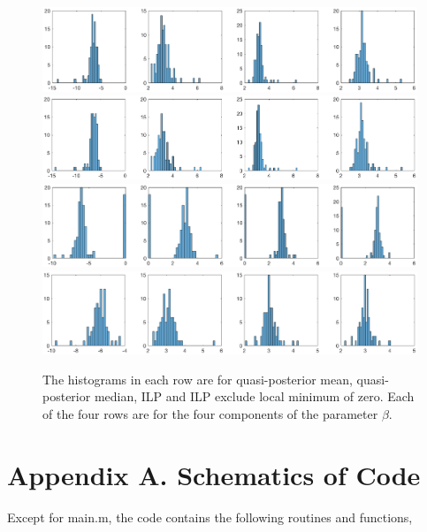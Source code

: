 \documentclass[12pt]{article}
\theoremstyle{plain} \newtheorem{theorem}{Theorem}
\theoremstyle{definition} \newtheorem{definition}{Definition}
\begin{document}
\begin{figure}[h]
    \centering
    \includegraphics[width=1.2\textwidth]{figures/lte-mean.eps}
    \includegraphics[width=1.2\textwidth]{figures/lte-median.eps}
    \includegraphics[width=1.2\textwidth]{figures/ilp-allrep.eps}
    \includegraphics[width=1.2\textwidth]{figures/ilp-exzero.eps}
    \caption{The histograms in each row are for quasi-posterior mean,
      quasi-posterior median, ILP and ILP exclude local minimum of
      zero. Each of the four rows are for the four components of the
      parameter $\beta$.}
    \label{fig:lte-mean}
\end{figure}


\clearpage

\nocite{*}




\clearpage

\section*{Appendix A. Schematics of Code}
\label{sec:appendixa}
Except for main.m, the code contains the following routines and functions,
\end{document}
